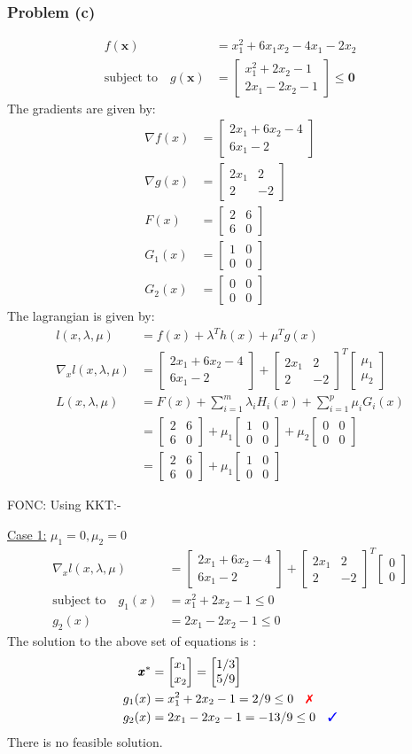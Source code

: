 \documentclass[a4paper,11pt]{article}
\newcommand{\V}[1]{\pmb{#1}}
\newcommand{\mat}[1]{\begin{bmatrix}#1\end{bmatrix}}
\newcommand{\cmark}{{\color{blue}\text{\ding{51}}}}%
\newcommand{\xmark}{{\color{red}\text{\ding{55}}}}%
\begin{document}
\subsubsection*{Problem (c)}
\begin{align*}
 f(\V{x}) &= x_1^2+6x_1x_2-4x_1 -2x_2\\
 \text{subject to}\quad g(\V{x})&= \mat{x_1^2 +2x_2-1\\ 2x_1-2x_2-1} \leq \V{0}
\end{align*}
The gradients are given by:
\begin{align*}
 \nabla f(x) &= \mat{2x_1 +6x_2 -4\\ 6x_1 -2}\\
 \nabla g(x) &= \mat{2x_1 & 2\\ 2&  -2}\\
 F(x) &= \mat{2&6\\6&0}\\
 G_1(x) &= \mat{1 & 0\\ 0& 0}\\
 G_2(x) &= \mat{0 & 0\\ 0 &0}
\end{align*}
The lagrangian is given by:
\begin{align*}
 l(x,\lambda,\mu) &= f(x) + \lambda^Th(x) + \mu^Tg(x)\\
 \nabla_x l(x,\lambda,\mu) &=  \mat{2x_1 +6x_2 -4\\ 6x_1 -2} +
\mat{2x_1 & 2\\ 2&  -2}^T\mat{\mu_1\\ \mu_2}\\
L(x,\lambda,\mu)&= F(x) + \sum_{i=1}^{m}\lambda_i H_i(x) + \sum_{i=1}^{p}\mu_i G_i(x)\\
&= \mat{2&6\\6&0} + \mu_1\mat{1 & 0\\ 0& 0} + \mu_2\mat{0 & 0\\ 0& 0}\\
&= \mat{2&6\\6&0} + \mu_1\mat{1 & 0\\ 0& 0}
\end{align*}

\noindent FONC: Using KKT:-

\noindent\underline{Case 1:} $\mu_1=0, \mu_2=0$
\begin{align*}
 \nabla_x l(x,\lambda,\mu) &= \mat{2x_1 +6x_2 -4\\ 6x_1 -2} +
\mat{2x_1 & 2\\ 2&  -2}^T\mat{0\\ 0}\\
% 
 \text{subject to}\quad g_1(x)&=x_1^2 +2x_2-1 \leq 0\\
 g_2(x)&=2x_1-2x_2-1\leq 0
\end{align*}
The solution to the above set of equations is :
\begin{align*}
 \V{x}^*&=\mat{x_1\\x_2} = \mat{1/3\\5/9}\\
 g_1(x)&=x_1^2 +2x_2-1 =2/9\leq 0 \quad \xmark\\
 g_2(x)&=2x_1-2x_2-1 =-13/9\leq 0 \quad \cmark
\end{align*}
There is no feasible solution.
\end{document}
